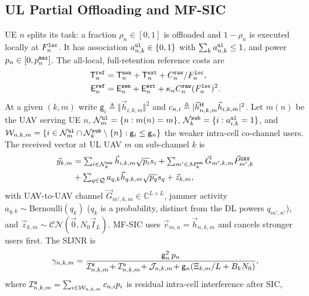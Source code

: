\documentclass[journal]{IEEEtran}
\begin{document}
\subsection{UL Partial Offloading and MF-SIC}
\label{sec:ul}
UE $n$ splits its task: a fraction $\rho_n\in[0,1]$ is offloaded and $1-\rho_n$ is executed locally at $F_n^{\tt loc}$. It has association $a_{n,k}^{\tt ul}\in\{0,1\}$ with $\sum_k a_{n,k}^{\tt ul}\le 1$, and power $p_n\in[0,p_n^{\tt max}]$. The all-local, full-retention reference costs are
\begin{align}
\mathsf{T}_n^{\tt ref}&=\mathsf{T}_n^{\tt sen}+\mathsf{T}_n^{\tt ext}+C_n^{\tt raw}/F_n^{\tt loc},
\label{eq:ref}\\
\mathsf{E}_n^{\tt ref}&=\mathsf{E}_n^{\tt sen}+\mathsf{E}_n^{\tt ext}+\kappa_n C_n^{\tt raw}(F_n^{\tt loc})^2 .
\nonumber
\end{align}
At a given $(k,m)$ write $\mathsf{g}_i\triangleq\Vert\vec{h}_{i,k,m}\Vert^2$ and $c_{n,i}\triangleq|\vec{h}_{n,k,m}^{\sf H}\vec{h}_{i,k,m}|^2$. Let $m(n)$ be the UAV serving UE $n$, $\mathcal{N}_m^{\tt ul}=\{n:m(n)=m\}$, $\mathcal{N}_k^{\tt sub}=\{i:a_{i,k}^{\tt ul}=1\}$, and $\mathcal{W}_{n,k,m}=\{i\in\mathcal{N}_m^{\tt ul}\cap\mathcal{N}_k^{\tt sub}\setminus\{n\}:\mathsf{g}_i\le\mathsf{g}_n\}$ the weaker intra-cell co-channel users. The received vector at UL UAV $m$ on sub-channel $k$ is
\begin{equation}
\begin{aligned}
\textstyle\vec{y}_{k,m}&=\textstyle\sum_{i\in\mathcal{N}_k^{\tt sub}}\vec{h}_{i,k,m}\sqrt{p_i}s_i+\sum_{m'\in\mathcal{M}_k^{\tt sub}}\vec{G}_{m',k,m}\vec{P}_{m',k}^{\tt UAV}\\
&\textstyle+\sum_{q\in\mathcal{Q}}a_{q,k}\vec{h}_{q,k,m}\sqrt{p_q}s_q+\vec{z}_{k,m},
\end{aligned}
\label{eq:ul_y}
\end{equation}
with UAV-to-UAV channel $\vec{G}_{m',k,m}\in\mathbb{C}^{L\times L}$, jammer activity $a_{q,k}\sim\mathrm{Bernoulli}(q_k)$ ($q_k$ is a probability, distinct from the DL powers $q_{m',n'}$), and $\vec{z}_{k,m}\sim\mathcal{CN}(\vec{0},N_0\vec{I}_L)$. MF-SIC uses $\vec{v}_{m,n}=\vec{h}_{n,k,m}$ and cancels stronger users first. The SIJNR is
\begin{equation}
\gamma_{n,k,m}
=\frac{\mathsf{g}_n^2\, p_n}
{\mathcal{I}_{n,k,m}^{\tt w}\!+\mathcal{I}_{n,k,m}^{\tt o}\!+\mathcal{J}_{n,k,m}
\!+\mathsf{g}_n(\Xi_{k,m}/L+B_kN_0)},
\label{eq:ul_sijnr}
\end{equation}
where $\mathcal{I}_{n,k,m}^{\tt w}=\sum_{i\in\mathcal{W}_{n,k,m}}c_{n,i} p_i$ is residual intra-cell interference after SIC,
\end{document}
